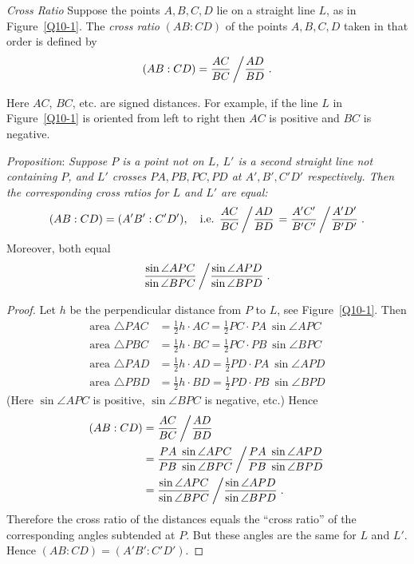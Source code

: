 \documentclass[11pt,a4paper]{report}
\theoremstyle{plain}
\theoremstyle{definition}
\begin{document}
\noindent \emph{Cross Ratio} \quad Suppose the points $ A, B, C, D $ lie on a straight line $ L $, as in Figure~\ref{Q10-1}.   The \emph{cross ratio}  $ (AB:CD) $ of  the points $  A, B, C, D $ taken in that  order is defined by
\begin{equation} \label{10rel}  
(AB:CD) = \frac{AC}{BC} \left/ \frac{AD} {BD}\right. .
\end{equation} 
 
Here $ AC $, $ BC $, etc. are signed distances.  For example, if the line $ L $ in Figure~\ref{Q10-1} is oriented from left to right then $ AC $ is positive and $ BC $ is negative.

\medskip
\noindent  \emph{Proposition}: \quad  \emph{Suppose  $ P $ is a point not on $ L $, $ L' $ is a second straight line not containing $ P $,   and $ L' $ crosses $ PA, PB, PC, P D$ at $ A', B', C' D' $ respectively.   Then  the corresponding cross ratios for $ L $ and $ L' $ are equal:
\[  
(AB:CD) = (A'B':C'D'), \quad \text{i.e. } \frac{AC}{BC} \left/ \frac{AD} {BD}\right.  =   \frac{A'C'}{B'C'} \left/ \frac{A'D'} {B'D'}\right. .
\]}
Moreover, both equal
\[
\frac{  \sin \angle APC} { \sin \angle BPC}  \left/ \frac{  \sin \angle APD} { \sin \angle BPD} \right. .
\]

\begin{proof} 
Let $ h $ be the perpendicular distance from $ P $ to $ L $, see Figure~\ref{Q10-1}.   Then
\begin{align*} 
\text{area } \triangle PAC &= \frac{1}{2} h \cdot AC = \frac{1}{2} PC \cdot PA\ \sin \angle APC \\
\text{area } \triangle PBC &= \frac{1}{2} h \cdot BC = \frac{1}{2} PC \cdot PB\ \sin \angle BPC \\
\text{area } \triangle PAD &= \frac{1}{2} h \cdot AD = \frac{1}{2} PD \cdot PA\ \sin \angle APD \\
\text{area } \triangle PBD &= \frac{1}{2} h \cdot BD = \frac{1}{2} PD \cdot PB\ \sin \angle BPD  
\end{align*} 
(Here $ \sin \angle APC $ is positive, $ \sin \angle BPC $ is negative, etc.) 
Hence
\begin{align} 
(AB:CD) &= \frac{AC}{BC} \left/ \frac{AD} {BD}\right. \notag\\
	&= \frac{PA \ \sin \angle APC} {PB\ \sin \angle BPC}  \left/ \frac{PA \ \sin \angle APD} {PB\ \sin \angle BPD} \right. \notag\\
	&= \frac{  \sin \angle APC} { \sin \angle BPC}  \left/ \frac{  \sin \angle APD} { \sin \angle BPD} \right. . \notag %
\end{align} 
Therefore the cross ratio of the distances equals the ``cross ratio'' of the corresponding angles subtended at $ P $.  But these angles are the same for $ L $ and $ L' $. Hence \mbox{$ (AB:CD) = (A'B':C'D')$}. 
\end{proof} 
\end{document}

